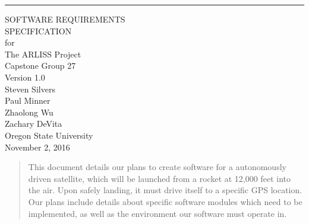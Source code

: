 \documentclass[10pt,onecolumn,draftclsnofoot,document]{IEEEtran}
\begin{document}


\def\myversion{1.0 }

\begin{flushright}
    	\rule{16cm}{5pt}\vskip1cm
    	\begin{bfseries}
        		\Huge{SOFTWARE REQUIREMENTS\\ SPECIFICATION}\\
        		\vspace{1.7cm}
        			for\\
        		\vspace{1.7cm}
        			The ARLISS Project\\
        		\vspace{.5cm}
        		\LARGE{Capstone Group 27}\\
        		\LARGE{Version \myversion}\\
        		\vspace{2.2cm}
        			Steven Silvers\\
			Paul Minner\\
        			Zhaolong Wu\\
			Zachary DeVita\\
        		\vspace{3cm}
        			Oregon State University\\
        			November 2, 2016\\
		\vspace{1cm}
    	\end{bfseries}
\end{flushright}
\begin{abstract}
\noindent This document details our plans to create software for a autonomously driven satellite, which will be launched from a rocket at 12,000 feet into the air. Upon safely landing, it must drive itself to a specific GPS location. Our plans include details about specific software modules which need to be implemented, as well as the environment our software must operate in.
\end{abstract}
\clearpage

\setcounter{tocdepth}{3}


\tableofcontents
\end{document}
